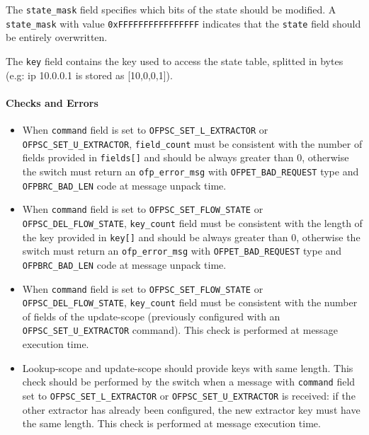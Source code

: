 The \texttt{state\_mask} field specifies which bits of the state should be modified. A \texttt{state\_mask} with value \texttt{0xFFFFFFFFFFFFFFFF} indicates that the \texttt{state} field should be entirely overwritten.

The \texttt{key} field contains the key used to access the state table, splitted in bytes (e.g: ip 10.0.0.1 is stored as [10,0,0,1]).

\paragraph{Checks and Errors}

\begin{itemize}
    \item When \texttt{command} field is set to \texttt{OFPSC\_SET\_L\_EXTRACTOR} or \texttt{OFPSC\_SET\_U\_EXTRACTOR}, \texttt{field\_count} must be consistent with the number of fields provided in \texttt{fields[]} and should be always greater than 0, otherwise the switch must return an \texttt{ofp\_error\_msg} with \texttt{OFPET\_BAD\_REQUEST} type and \texttt{OFPBRC\_BAD\_LEN} code at message unpack time.

    \item When \texttt{command} field is set to \texttt{OFPSC\_SET\_FLOW\_STATE} or \texttt{OFPSC\_DEL\_FLOW\_STATE}, \texttt{key\_count} field must be consistent with the length of the key provided in \texttt{key[]} and should be always greater than 0, otherwise the switch must return an \texttt{ofp\_error\_msg} with \texttt{OFPET\_BAD\_REQUEST} type and \texttt{OFPBRC\_BAD\_LEN} code at message unpack time.

    \item When \texttt{command} field is set to \texttt{OFPSC\_SET\_FLOW\_STATE} or \texttt{OFPSC\_DEL\_FLOW\_STATE}, \texttt{key\_count} field must be consistent with the number of fields of the update-scope (previously configured with an \texttt{OFPSC\_SET\_U\_EXTRACTOR} command). This check is performed at message execution time.

    \item Lookup-scope and update-scope should provide keys with same length. This check should be performed by the switch when a message with \texttt{command} field set to \texttt{OFPSC\_SET\_L\_EXTRACTOR} or \texttt{OFPSC\_SET\_U\_EXTRACTOR} is received: if the other extractor has already been configured, the new extractor key must have the same length. This check is performed at message execution time.


\end{itemize}
